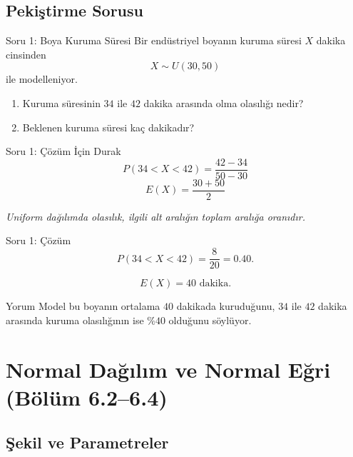 \documentclass[light]{lutbeamer}
\begin{document}
\subsection{Pekiştirme Sorusu}

\begin{frame}{Soru 1: Boya Kuruma Süresi}
    \small
    Bir endüstriyel boyanın kuruma süresi \(X\) dakika cinsinden
    \[
    X \sim U(30,50)
    \]
    ile modelleniyor.

    \begin{enumerate}
        \item[(a)] Kuruma süresinin \(34\) ile \(42\) dakika arasında olma olasılığı nedir?
        \item[(b)] Beklenen kuruma süresi kaç dakikadır?
    \end{enumerate}
\end{frame}

\begin{frame}{Soru 1: Çözüm İçin Durak}
    \color{red!70!black}
    \small
    \[
    P(34<X<42)=\frac{42-34}{50-30}
    \]
    \[
    E(X)=\frac{30+50}{2}
    \]

    \begin{center}
        \textit{Uniform dağılımda olasılık, ilgili alt aralığın toplam aralığa oranıdır.}
    \end{center}
\end{frame}

\begin{frame}{Soru 1: Çözüm}
    \small
    \[
    P(34<X<42)=\frac{8}{20}=0.40.
    \]

    \[
    E(X)=40 \text{ dakika}.
    \]

    \begin{exampleblock}{Yorum}
        Model bu boyanın ortalama \(40\) dakikada kuruduğunu, \(34\) ile \(42\) dakika arasında kuruma olasılığının ise \(\%40\) olduğunu söylüyor.
    \end{exampleblock}
\end{frame}

\section{Normal Dağılım ve Normal Eğri (Bölüm 6.2--6.4)}
\subsection{Şekil ve Parametreler}
\end{document}
